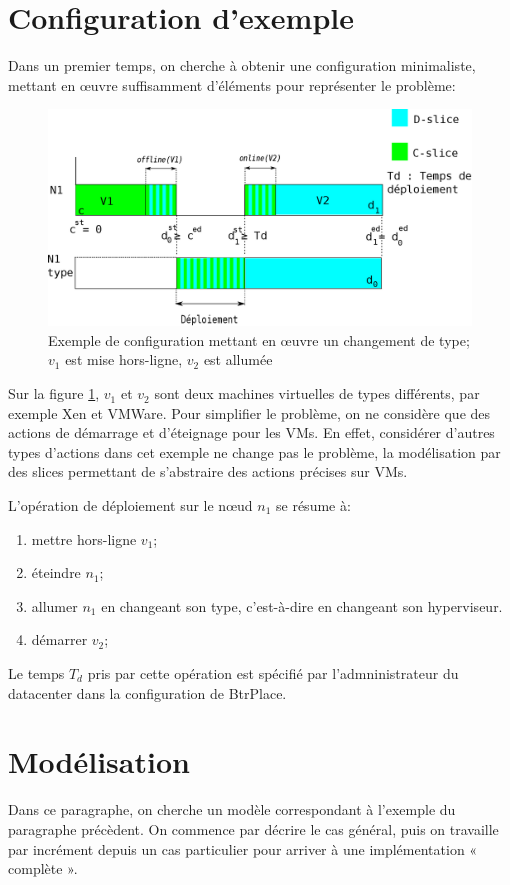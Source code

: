 \documentclass[a4paper]{article}
\begin{document}
\section{Configuration d'exemple}
Dans un premier temps, on cherche à obtenir une configuration minimaliste,
mettant en œuvre suffisamment d'éléments pour représenter le problème:
\begin{figure}[!ht]
	\centering
	\includegraphics[scale=.45]{imgs/config.eps}
	\caption{\label{config} Exemple de configuration mettant en œuvre un
		changement de type; $v_1$ est mise hors-ligne, $v_2$ est allumée}
\end{figure}

Sur la figure \ref{config}, $v_1$ et $v_2$ sont deux machines
virtuelles de types différents, par exemple Xen et VMWare.
Pour simplifier le problème, on ne considère que des actions
de démarrage et d'éteignage pour les VMs. En effet, considérer
d'autres types d'actions dans cet exemple ne change pas le
problème, la modélisation par des slices permettant de s'abstraire
des actions précises sur VMs.

L'opération de déploiement sur le nœud $n_1$ se résume à:
\begin{enumerate}
	\item mettre hors-ligne $v_1$;
	\item éteindre $n_1$;
	\item allumer $n_1$ en changeant son type, c'est-à-dire en changeant
		son hyperviseur.
	\item démarrer $v_2$;
\end{enumerate}
Le temps $T_d$ pris par cette opération est spécifié par l'admninistrateur
du datacenter dans la configuration de BtrPlace.

\section{Modélisation}
Dans ce  paragraphe, on cherche un modèle correspondant à l'exemple du
paragraphe précèdent. On commence par décrire le cas général, puis on
travaille par incrément depuis un cas particulier pour arriver à une
implémentation « complète ».
\end{document}
